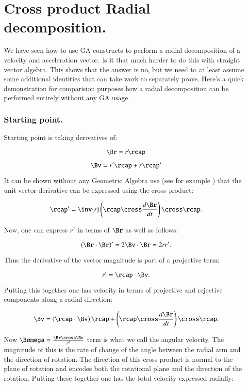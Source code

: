 \chapter{Cross product Radial decomposition.}\label{chap:PJAngAccCross}
\date{July 8, 2008.  $RCSfile: angularAccCross.tex,v $ Last $Revision: 1.10 $ $Date: 2009/06/11 16:45:58 $ }

We have seen how to use GA constructs to perform a radial 
decomposition of a velocity and acceleration vector.  Is it that
much harder to do this with straight vector algebra.  This shows that
the answer is no, but we need to at least assume some additional
identities that can take work to separately prove.  Here's a quick
demonstration for comparision purposes how a radial decomposition 
can be performed entirely without any GA usage.

\subsection{Starting point.}

Starting point is taking derivatives of:

\[
\Br = r \rcap
\]

\[
\Bv = r' \rcap + r \rcap'
\]

It can be shown without any Geometric Algebra use (see for example \cite{salas1990coa}) that the unit vector derivative can be expressed using the cross product:

\[
\rcap' = \inv{r} \left(\rcap \cross \frac{d\Br}{dt}\right) \cross \rcap.
\]

Now, one can express $r'$ in terms of $\Br$ as well as follows:

\[
\left(\Br \cdot \Br\right)' = 2 \Bv \cdot \Br = 2 r r'.
\]

Thus the derivative of the vector magnitude is part of a projective term:

\[
r' = \rcap \cdot \Bv.
\]

Putting this together one has velocity in terms of projective and rejective
components along a radial direction:

\[
\Bv = \left(\rcap \cdot \Bv\right) \rcap + \left(\rcap \cross \frac{d\Br}{dt}\right) \cross \rcap.
\]

Now $\Bomega = \frac{\Br \cross \Bv}{r^2}$ term is what we call the angular velocity.  The magnitude of this
is the rate of change of the angle between the radial arm and the direction of rotation.  The direction of this
cross product is normal to the plane of rotation and encodes both the rotational plane and the direction of the
rotation.  Putting these together one has the total velocity expressed radially:

